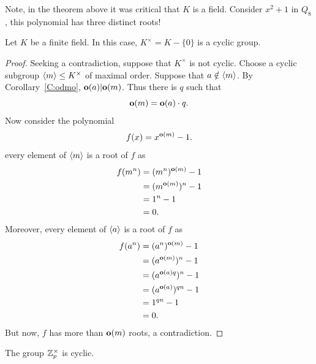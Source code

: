 \documentclass{ximera}
\begin{document}
\begin{remark}
  Note, in the theorem above it was critical that $K$ is a
  field. Consider $x^2+1$ in $Q_8$, this polynomial has three
  distinct roots!
\end{remark}



\begin{theorem}
  Let $K$ be a finite field. In this case, $K^\times = K-\{0\}$ is a
  cyclic group.
  \begin{proof}
    Seeking a contradiction, suppose that $K^\times$ is not
    cyclic. Choose a cyclic subgroup $\langle m\rangle \leq K^\times$ of
    maximal order. Suppose that $a\notin\langle m\rangle$. By
    Corollary~\ref{C:odmo}, $\mathbf o(a)|\mathbf o(m)$. Thus there is $q$ such that
    \[
    \mathbf o(m) = \mathbf o(a)\cdot q.
    \]
    Now consider the polynomial
    \[
    f(x) = x^{\mathbf o(m)}-1.
    \]
    every element of $\langle m\rangle$ is a root of $f$ as
    \begin{align*}
    f(m^n) &=  (m^n)^{\mathbf o(m)} - 1\\
    &= (m^{\mathbf o(m)})^n-1\\
    &= 1^n-1\\
    &=0.
    \end{align*}
    Moreover, every element of $\langle a\rangle$ is a root of $f$ as
    \begin{align*}
    f(a^n) &=  (a^n)^{\mathbf o(m)} - 1\\
    &= (a^{\mathbf o(m)})^n-1\\
    &= (a^{\mathbf o(a)q})^n-1\\
    &= (a^{\mathbf o(a)})^{qn}-1\\
    &= 1^{qn}-1\\
    &=0.
    \end{align*}
    But now, $f$ has more than $\mathbf o(m)$ roots, a contradiction.
  \end{proof}
\end{theorem}

\begin{corollary}
  The group $\mathbb Z_p^\times$ is cyclic.
\end{corollary}
\end{document}

